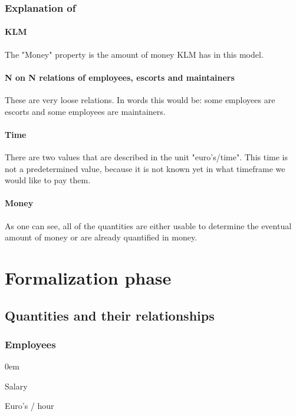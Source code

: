 \documentclass[a4paper, 12pt, notitlepage]{report}
\begin{document}
\subsection{Explanation of}
\subsubsection{KLM}
The "Money" property is the amount of money KLM has in this model.

\subsubsection{N on N relations of employees, escorts and maintainers}
These are very loose relations. In words this would be: some employees are escorts and some employees are maintainers.

\subsubsection{Time}
There are two values that are described in the unit "euro's/time". This time is not a predetermined value, because it is not known yet in what timeframe we would like to pay them.

\subsubsection{Money}
As one can see, all of the quantities are either usable to determine the eventual amount of money or are already quantified in money.

\chapter{Formalization phase}
\section{Quantities and their relationships}
	\subsection{Employees}
	\begin{description}
	\itemsep0em
	\item[Property:] Salary
	\item[Unit:] Euro's / hour
	\item[Role:] 
	\end{description}
\end{document}
